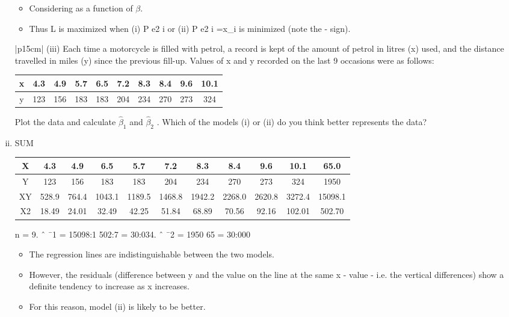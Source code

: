 \documentclass[a4paper,12pt]{article}
\begin{document}
\begin{enumerate}[(i)]
\begin{itemize}
\item Considering as a function
of $\beta$. 
\item Thus L is maximized when (i)
P
e2
i or (ii)
P
e2
i =x_{i} is minimized (note
the - sign).
\end{itemize}
    
  \begin{table}[ht!]
     \centering
     \begin{tabular}{|p{15cm}|}
     \hline  
(iii) Each time a motorcycle is filled with petrol, a record is kept of the amount of petrol in litres (x) used, and the distance travelled in miles (y) since the previous fill-up. Values of x and y recorded on the last 9 occasions were as follows:
\begin{center}
 \begin{tabular}{|c||c|c|c|c|c|c|c|c|c|} \hline 
x & 4.3 & 4.9 & 5.7 & 6.5 & 7.2& 8.3 &8.4 &9.6 &10.1\\ \hline 
y & 123 & 156 & 183 & 183 & 204 & 234& 270 & 273 & 324\\ \hline 
\end{tabular}
   
\end{center}

Plot the data and calculate $\hat{\beta}_1$ and $\hat{\beta}_2$ .  Which of the models (i) or (ii) do you think better represents the data? 
\\ \hline
      \end{tabular}
    \end{table}
\item 
SUM
\begin{center}
\begin{tabular}{c|c|c|c|c|c|c|c|c|c|c|}\hline
X & 4.3& 4.9& 6.5& 5.7& 7.2& 8.3 &8.4 &9.6 &10.1 &  65.0\\ \hline
Y & 123 & 156 & 183 & 183 & 204&  234 & 270& 273 & 324 & 1950\\ \hline
XY & 528.9 & 764.4& 1043.1 & 1189.5& 1468.8& 1942.2 & 2268.0& 2620.8& 3272.4 & 15098.1\\ \hline
X2 & 18.49& 24.01& 32.49& 42.25& 51.84 & 68.89&  70.56& 92.16& 102.01 & 502.70\\ \hline
\end{tabular}
\end{center}


n = 9. ˆ ¯1 = 15098:1
502:7 = 30:034. ˆ ¯2 = 1950
65 = 30:000

\begin{itemize}
\item The regression lines are indistinguishable between the two models. 
\item However,
the residuals (difference between y and the value on the line at the same x
- value - i.e. the vertical differences) show a definite tendency to increase as
x increases.
\item For this reason, model (ii) is likely to be better.
\end{itemize}
\end{enumerate}
\end{document}
